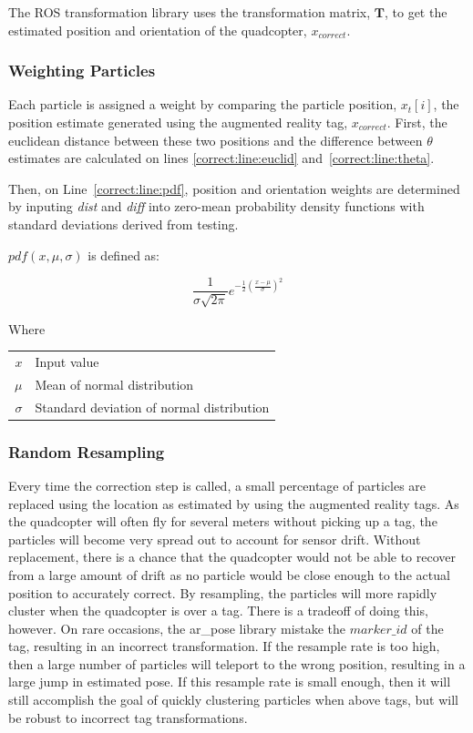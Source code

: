 			The ROS transformation library uses the transformation matrix, $\textbf{T}$, to get the estimated position and orientation of the quadcopter, $x_{correct}$.

		\subsubsection{Weighting Particles}
			Each particle is assigned a weight by comparing the particle position, $x_t[i]$, the position estimate generated using the augmented reality tag, $x_{correct}$. First, the euclidean distance between these two positions and the difference between $\theta$ estimates are calculated on lines \ref{correct:line:euclid} and~\ref{correct:line:theta}.

			Then, on Line~\ref{correct:line:pdf}, position and orientation weights are determined by inputing \textit{dist} and \textit{diff} into zero-mean probability density functions with standard deviations derived from testing.

			$pdf(x, \mu, \sigma)$ is defined as:

			\[ \frac{1}{\sigma\sqrt{2\pi}}e^{-\frac{1}{2}(\frac{x-\mu}{\sigma})^2} \]
			
			Where

			\begin{table}[H]
				\centering
			\begin{tabular}{@{}r@{$\quad$\,}l}
				$x$ & Input value\\
				$\mu$ & Mean of normal distribution\\
				$\sigma$ & Standard deviation of normal distribution
			\end{tabular}
			\end{table}

		 
		\subsubsection{Random Resampling}

			Every time the correction step is called, a small percentage of particles are replaced using the location as estimated by using the augmented reality tags. As the quadcopter will often fly for several meters without picking up a tag, the particles will become very spread out to account for sensor drift. Without replacement, there is a chance that the quadcopter would not be able to recover from a large amount of drift as no particle would be close enough to the actual position to accurately correct. By resampling, the particles will more rapidly cluster when the quadcopter is over a tag. There is a tradeoff of doing this, however. On rare occasions, the ar\_pose library mistake the $marker\_id$ of the tag, resulting in an incorrect transformation. If the resample rate is too high, then a large number of particles will teleport to the wrong position, resulting in a large jump in estimated pose. If this resample rate is small enough, then it will still accomplish the goal of quickly clustering particles when above tags, but will be robust to incorrect tag transformations.


